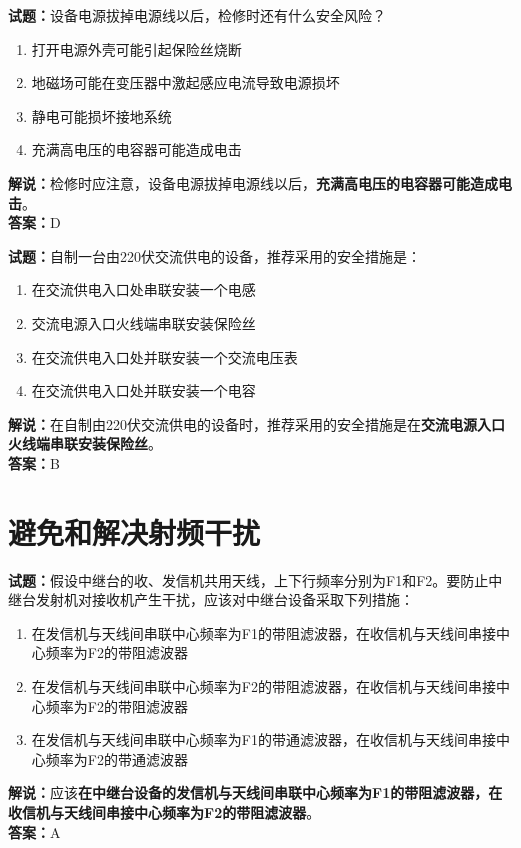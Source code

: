 \documentclass{ctexbook}
\begin{document}
\bigskip


\noindent\textbf{试题：}设备电源拔掉电源线以后，检修时还有什么安全风险？
\begin{enumerate}[leftmargin=3em]
	\item 打开电源外壳可能引起保险丝烧断
	\item 地磁场可能在变压器中激起感应电流导致电源损坏
	\item 静电可能损坏接地系统
	\item 充满高电压的电容器可能造成电击
\end{enumerate}
\noindent\textbf{解说：}检修时应注意，设备电源拔掉电源线以后，\textbf{充满高电压的电容器可能造成电击}。\\\noindent\textbf{答案：}D

\bigskip


\noindent\textbf{试题：}自制一台由220伏交流供电的设备，推荐采用的安全措施是：
\begin{enumerate}[leftmargin=3em]
	\item 在交流供电入口处串联安装一个电感
	\item 交流电源入口火线端串联安装保险丝
	\item 在交流供电入口处并联安装一个交流电压表
	\item 在交流供电入口处并联安装一个电容
\end{enumerate}
\noindent\textbf{解说：}在自制由220伏交流供电的设备时，推荐采用的安全措施是在\textbf{交流电源入口火线端串联安装保险丝}。\\\noindent\textbf{答案：}B












\chapter{避免和解决射频干扰}



\noindent\textbf{试题：}假设中继台的收、发信机共用天线，上下行频率分别为F1和F2。要防止中继台发射机对接收机产生干扰，应该对中继台设备采取下列措施：
\begin{enumerate}[leftmargin=3em]
	\item 在发信机与天线间串联中心频率为F1的带阻滤波器，在收信机与天线间串接中心频率为F2的带阻滤波器
	\item 在发信机与天线间串联中心频率为F2的带阻滤波器，在收信机与天线间串接中心频率为F2的带阻滤波器
	\item 在发信机与天线间串联中心频率为F1的带通滤波器，在收信机与天线间串接中心频率为F2的带通滤波器
\end{enumerate}
\noindent\textbf{解说：}应该\textbf{在中继台设备的发信机与天线间串联中心频率为F1的带阻滤波器，在收信机与天线间串接中心频率为F2的带阻滤波器}。\\\noindent\textbf{答案：}A
\end{document}
